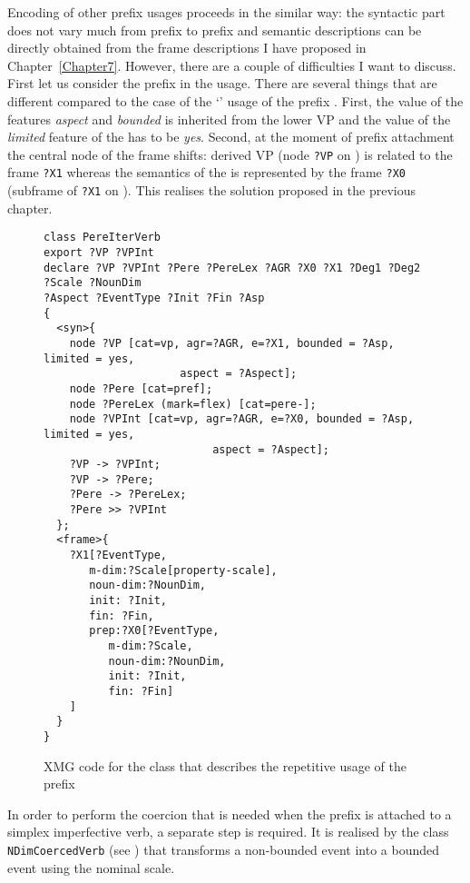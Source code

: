 Encoding of other prefix usages proceeds in the similar way: the syntactic part does not vary much from prefix to prefix and semantic descriptions can be directly obtained from the frame descriptions I have proposed in Chapter~\ref{Chapter7}. However, there are a couple of difficulties I want to discuss. First let us consider the prefix  in the  usage. There are several things that are different compared to the case of the `' usage of the prefix . First, the value of the features \textit{aspect} and \textit{bounded} is inherited from the  lower VP and the value of the \textit{limited} feature of the  has to be \textit{yes}. Second, at the moment of prefix attachment the central node of the frame shifts: derived VP (node \texttt{?VP} on ) is related to the frame \texttt{?X1} whereas the semantics of the  is represented by the frame \texttt{?X0} (subframe of \texttt{?X1} on ). This realises the solution proposed in the previous chapter. 

\begin{figure}
\begin{lstlisting}[style=xmg]
class PereIterVerb
export ?VP ?VPInt 
declare ?VP ?VPInt ?Pere ?PereLex ?AGR ?X0 ?X1 ?Deg1 ?Deg2 ?Scale ?NounDim
?Aspect ?EventType ?Init ?Fin ?Asp
{
  <syn>{
    node ?VP [cat=vp, agr=?AGR, e=?X1, bounded = ?Asp, limited = yes, 
    				 aspect = ?Aspect];
    node ?Pere [cat=pref];
    node ?PereLex (mark=flex) [cat=pere-];
    node ?VPInt [cat=vp, agr=?AGR, e=?X0, bounded = ?Asp, limited = yes, 
    					  aspect = ?Aspect];
    ?VP -> ?VPInt;
    ?VP -> ?Pere;
    ?Pere -> ?PereLex;
    ?Pere >> ?VPInt
  };
  <frame>{
    ?X1[?EventType,
       m-dim:?Scale[property-scale],
       noun-dim:?NounDim,
       init: ?Init,
       fin: ?Fin,
       prep:?X0[?EventType,
          m-dim:?Scale,
          noun-dim:?NounDim,
          init: ?Init,
          fin: ?Fin]
    ]
  }
}
\end{lstlisting}
\caption{XMG code for the class that describes the repetitive usage of the prefix \label{code:pere}}
\end{figure}

In order to perform the coercion that is needed when the prefix  is attached to a simplex imperfective verb, a separate step is required. It is realised by the class \texttt{NDimCoercedVerb} (see ) that transforms a non-bounded event into a bounded event using the nominal scale.

